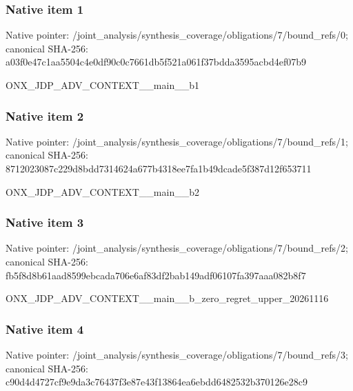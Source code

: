 \documentclass[10pt,a4paper]{article}
\begin{document}
\subsubsection{Native item 1}
Native pointer: /joint\_\allowbreak{}analysis/synthesis\_\allowbreak{}coverage/obligations/7/bound\_\allowbreak{}refs/0; canonical SHA-256: a03f0e47c1aa5504c4e0df90c0c7661db5f521a061f37bdda3595acbd4ef07b9

\begingroup\raggedright\sloppy ONX\_\allowbreak{}JDP\_\allowbreak{}ADV\_\allowbreak{}CONTEXT\_\allowbreak{}\_\allowbreak{}main\_\allowbreak{}\_\allowbreak{}b1\par\endgroup

\subsubsection{Native item 2}
Native pointer: /joint\_\allowbreak{}analysis/synthesis\_\allowbreak{}coverage/obligations/7/bound\_\allowbreak{}refs/1; canonical SHA-256: 8712023087c229d8bdd7314624a677b4318ee7fa1b49dcade5f387d12f653711

\begingroup\raggedright\sloppy ONX\_\allowbreak{}JDP\_\allowbreak{}ADV\_\allowbreak{}CONTEXT\_\allowbreak{}\_\allowbreak{}main\_\allowbreak{}\_\allowbreak{}b2\par\endgroup

\subsubsection{Native item 3}
Native pointer: /joint\_\allowbreak{}analysis/synthesis\_\allowbreak{}coverage/obligations/7/bound\_\allowbreak{}refs/2; canonical SHA-256: fb5f8d8b61aad8599ebcada706e6af83df2bab149adf06107fa397aaa082b8f7

\begingroup\raggedright\sloppy ONX\_\allowbreak{}JDP\_\allowbreak{}ADV\_\allowbreak{}CONTEXT\_\allowbreak{}\_\allowbreak{}main\_\allowbreak{}\_\allowbreak{}b\_\allowbreak{}zero\_\allowbreak{}regret\_\allowbreak{}upper\_\allowbreak{}20261116\par\endgroup

\subsubsection{Native item 4}
Native pointer: /joint\_\allowbreak{}analysis/synthesis\_\allowbreak{}coverage/obligations/7/bound\_\allowbreak{}refs/3; canonical SHA-256: c90d4d4727cf9e9da3c76437f3e87e43f13864ea6ebdd6482532b370126e28c9
\end{document}
